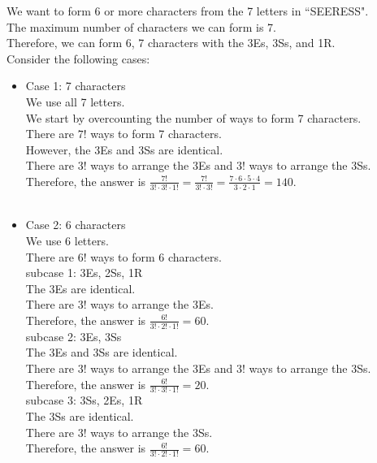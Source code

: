 \documentclass[12pt]{exam}
\begin{document}
\begin{solution}
	We want to form 6 or more characters from the 7 letters in ``SEERESS".\\
	The maximum number of characters we can form is 7.\\
	Therefore, we can form 6, 7 characters with the 3Es, 3Ss, and 1R.\\
	Consider the following cases:
	\begin{itemize}
		\item Case 1: 7 characters\\
		      We use all 7 letters.\\
		      We start by overcounting the number of ways to form 7 characters.\\
		      There are $7!$ ways to form 7 characters.\\
		      However, the 3Es and 3Ss are identical.\\
		      There are $3!$ ways to arrange the 3Es and $3!$ ways to arrange the 3Ss.\\
		      Therefore, the answer is $\frac{7!}{3! \cdot 3!\cdot 1!} = \frac{7!}{3! \cdot 3!}= \frac{7\cdot 6\cdot 5\cdot 4}{3\cdot 2\cdot 1} = 140$.\\\\
		\item Case 2: 6 characters\\
		      We use 6 letters.\\
		      There are $6!$ ways to form 6 characters.\\
		      subcase 1: 3Es, 2Ss, 1R\\
		      The 3Es are identical.\\
		      There are $3!$ ways to arrange the 3Es.\\
		      Therefore, the answer is $\frac{6!}{3! \cdot 2!\cdot 1!} = 60$.\\
		      subcase 2: 3Es, 3Ss\\
		      The 3Es and 3Ss are identical.\\
		      There are $3!$ ways to arrange the 3Es and $3!$ ways to arrange the 3Ss.\\
		      Therefore, the answer is $\frac{6!}{3! \cdot 3!\cdot 1!} = 20$.\\
		      subcase 3: 3Ss, 2Es, 1R\\
		      The 3Ss are identical.\\
		      There are $3!$ ways to arrange the 3Ss.\\
		      Therefore, the answer is $\frac{6!}{3! \cdot 2!\cdot 1!} = 60$.\\
	\end{itemize}

\end{solution}
\end{document}
